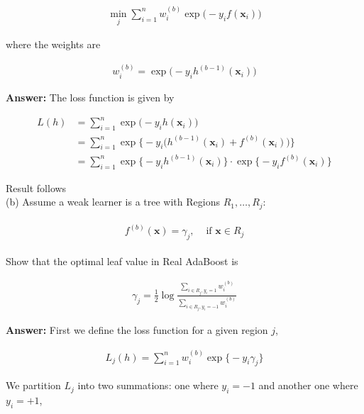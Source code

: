 \documentclass[11pt]{article}
\begin{document}
    \begin{align*}
        \min\limits_{j} \sum_{i = 1}^n w^{(b)}_i \exp \bigg(-y_i f(\mathbf{x}_i)\bigg)
    \end{align*}

    where the weights are 

    \begin{align*}
        w^{(b)}_i = \exp \bigg(-y_i h^{(b - 1)}(\mathbf{x}_i)\bigg)
    \end{align*}

    \textbf{Answer:} The loss function is given by

    \begin{align*}
        L(h) 
        &= \sum_{i = 1}^n \exp \bigg(-y_i h(\mathbf{x}_i)\bigg) \\ 
        &= \sum_{i = 1}^n \exp \bigg\{-y_i \bigg(h^{(b - 1)}(\mathbf{x}_i) + f^{(b)}(\mathbf{x}_i)
            \bigg)\bigg\} \\ 
        &= \sum_{i = 1}^n \exp \bigg\{-y_i h^{(b - 1)}(\mathbf{x}_i)\bigg\} \cdot \exp \bigg\{-y_i
            f^{(b)}(\mathbf{x}_i)\bigg\}
    \end{align*}

    Result follows \\ 

    (b) Assume a weak learner is a tree with Regions $R_1, \dots, R_j$:
    
    \begin{align*}
        \begin{matrix}
            f^{(b)}(\mathbf{x}) = \gamma_j, 
            & \text{ if } \mathbf{x} \in R_j
        \end{matrix}
    \end{align*}

    Show that the optimal leaf value in Real AdaBoost is 

    \begin{align*}
        \gamma_j = \frac{1}{2}\log \frac{\sum_{i \in R_j, y_i = 1} w^{(b)}_i}{\sum_{i \in R_j, y_i =
        -1}w^{(b)}_i}
    \end{align*}

    \textbf{Answer:} First we define the loss function for a given region $j$, 

    \begin{align*}
        L_j(h) = \sum_{i = 1}^n w^{(b)}_i \exp \bigg\{-y_i \gamma_j\bigg\}
    \end{align*}

    We partition $L_j$ into two summations: one where $y_i = -1$ and another one where $y_i = +1$,
\end{document}
